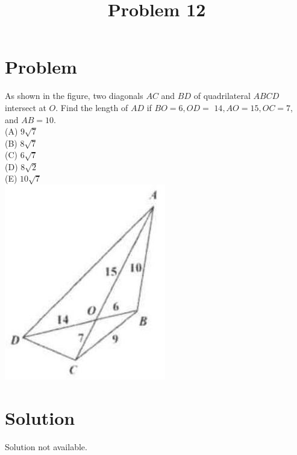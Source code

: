 \documentclass{article}
\title{Problem 12}
\date{}
\begin{document}
\maketitle

\section*{Problem}
As shown in the figure, two diagonals \(A C\) and \(B D\) of quadrilateral \(A B C D\) intersect at \(O\). Find the length of \(A D\) if \(B O=6, O D=\) \(14, A O=15, O C=7\), and \(A B=10\).\\
(A) \(9 \sqrt{7}\)\\
(B) \(8 \sqrt{7}\)\\
(C) \(6 \sqrt{7}\)\\
(D) \(8 \sqrt{2}\)\\
(E) \(10 \sqrt{7}\)\\
\centering
\includegraphics[width=\textwidth]{images/090(2).jpg}

\section*{Solution}
Solution not available.
\end{document}
